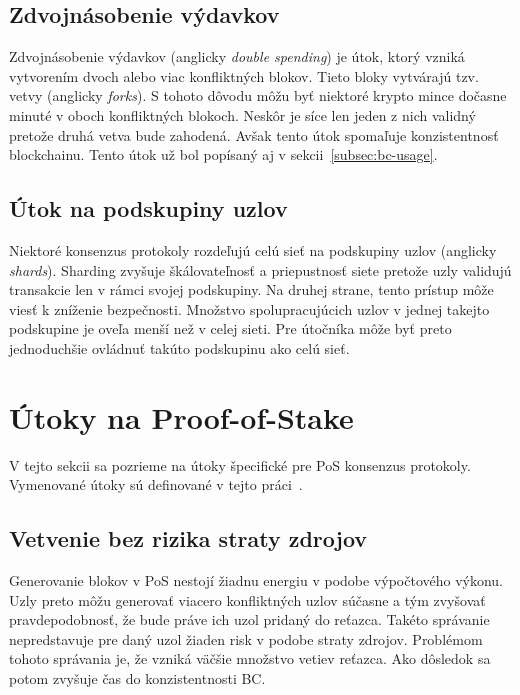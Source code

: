 \subsection{Zdvojnásobenie výdavkov}

Zdvojnásobenie výdavkov (anglicky \textit{double spending}) je útok, ktorý vzniká vytvorením dvoch alebo viac konfliktných blokov. Tieto bloky vytvárajú tzv. vetvy (anglicky \textit{forks}). S tohoto dôvodu môžu byť niektoré krypto mince dočasne minuté v oboch konfliktných blokoch. Neskôr je síce len jeden z nich validný pretože druhá vetva bude zahodená. Avšak tento útok spomaľuje konzistentnosť blockchainu. Tento útok už bol popísaný aj v sekcii~\ref{subsec:bc-usage}.

\subsection{Útok na podskupiny uzlov}\label{subsec:shard-attack}

Niektoré konsenzus protokoly rozdeľujú celú sieť na podskupiny uzlov (anglicky \textit{shards}). Sharding zvyšuje škálovateľnosť a priepustnosť siete pretože uzly validujú transakcie len v rámci svojej podskupiny. Na druhej strane, tento prístup môže viesť k zníženie bezpečnosti. Množstvo spolupracujúcich uzlov v jednej takejto podskupine je oveľa menší než v celej sieti. Pre útočníka môže byť preto jednoduchšie ovládnuť takúto podskupinu ako celú sieť.

%

\section{Útoky na Proof-of-Stake}\label{sec:pos-attacks}
V tejto sekcii sa pozrieme na útoky špecifické pre PoS konsenzus protokoly. Vymenované útoky sú definované v tejto práci~\cite{homoliakBlockchain}.

\subsection{Vetvenie bez rizika straty zdrojov}
Generovanie blokov v PoS nestojí žiadnu energiu v podobe výpočtového výkonu. Uzly preto môžu generovať viacero konfliktných uzlov súčasne a tým zvyšovať pravdepodobnosť, že bude práve ich uzol pridaný do reťazca. Takéto správanie nepredstavuje pre daný uzol žiaden risk v podobe straty zdrojov. Problémom tohoto správania je, že vzniká väčšie množstvo vetiev reťazca. Ako dôsledok sa potom zvyšuje čas do konzistentnosti BC.

